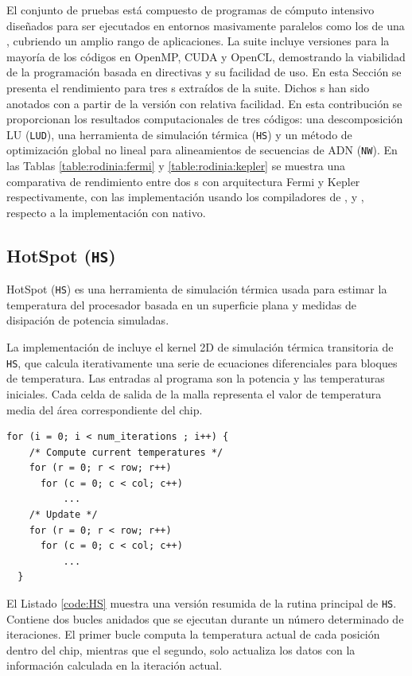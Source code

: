 El conjunto de pruebas \rodinia{} \cite{Che:2010:CRB} está compuesto de 
programas de cómputo intensivo diseñados para ser ejecutados en entornos 
masivamente paralelos como los de una \GPU{}, cubriendo un amplio rango de 
aplicaciones.
La suite incluye versiones para la mayoría de los códigos en OpenMP, CUDA y OpenCL,
demostrando la viabilidad de la programación basada en directivas y su facilidad de uso.
En esta Sección se
presenta el rendimiento para tres \benchmark{}s extraídos de la suite. Dichos 
\benchmark{}s han sido anotados con 
\OpenACC{} a partir de la versión \OpenMP{} con relativa facilidad.
En esta contribución se proporcionan los resultados computacionales de tres códigos:
una descomposición LU (\texttt{LUD}),
una herramienta de simulación térmica (\texttt{HS}) y un método de optimización global 
no lineal para alineamientos de secuencias de ADN (\texttt{NW}).
En las Tablas \ref{table:rodinia:fermi} y \ref{table:rodinia:kepler} se muestra una 
comparativa de rendimiento entre dos \GPU{}s con arquitectura Fermi y Kepler 
respectivamente, 
con las implementación \OpenACC{} usando los compiladores de \PGI{}, \CAPS{} y \accULL{}, 
respecto a la implementación con \CUDA{} nativo.

\subsection{HotSpot (\texttt{HS})}

HotSpot (\texttt{HS}) es una herramienta de simulación térmica usada para
estimar la temperatura del procesador basada en un superficie plana y medidas de 
disipación de potencia simuladas.

La implementación de \rodinia{} incluye el kernel 2D de simulación térmica transitoria
de \texttt{HS},
que calcula iterativamente una serie de ecuaciones diferenciales para bloques de 
temperatura. 
Las entradas al programa son la potencia y las temperaturas iniciales. 
Cada celda de salida de la malla representa el valor de temperatura media del área
correspondiente del chip.

\begin{lstlisting}[caption={Bucle principal de \texttt{HS}},label=code:HS]
for (i = 0; i < num_iterations ; i++) { 
    /* Compute current temperatures */
    for (r = 0; r < row; r++) 
      for (c = 0; c < col; c++) 
          ...
    /* Update */
    for (r = 0; r < row; r++) 
      for (c = 0; c < col; c++) 
          ...
  }
\end{lstlisting}
El Listado \ref{code:HS} muestra una versión resumida de la rutina principal de
 \texttt{HS}. Contiene dos bucles anidados que se ejecutan durante un número determinado 
de iteraciones. El primer bucle computa la temperatura actual de cada posición dentro del 
chip, mientras que el segundo, solo actualiza los datos con la información calculada en la 
iteración actual.

